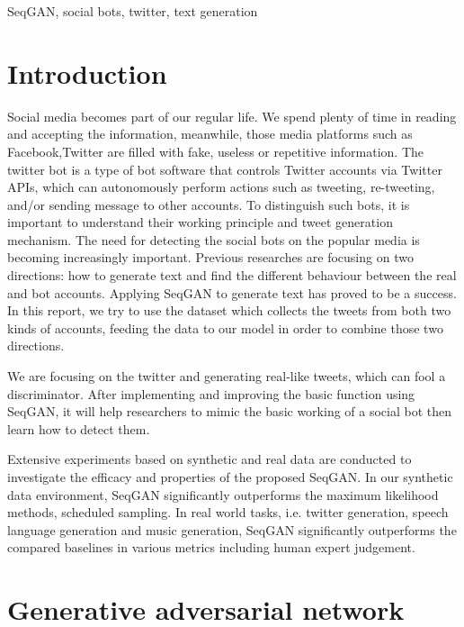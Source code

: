 \documentclass[conference]{IEEEtran}
\begin{document}
\begin{IEEEkeywords}
SeqGAN, social bots, twitter, text generation
\end{IEEEkeywords}

\section{Introduction}
    Social media becomes part of our regular life. We spend plenty of time in reading and accepting the information, meanwhile, those media platforms such as Facebook,Twitter are filled with fake, useless or repetitive information. The twitter bot is a type of bot software that controls Twitter accounts via Twitter APIs, which can autonomously perform actions such as tweeting, re-tweeting, and/or sending message to other accounts. To distinguish such bots, it is important to understand their working principle and tweet generation mechanism. The need for detecting the social bots on the popular media is becoming increasingly important. Previous researches are focusing on two directions: how to generate text and find the different behaviour between the real and bot accounts. Applying SeqGAN to generate text has proved to be a success. In this report, we try to use the dataset which collects the tweets from both two kinds of accounts, feeding the data to our model in order to combine those two directions.
    
    We are focusing on the twitter and generating real-like tweets, which can fool a discriminator. After implementing and improving the basic function using SeqGAN, it will help researchers to mimic the basic working of a social bot then learn how to detect them.
    
    Extensive experiments based on synthetic and real data
    are conducted to investigate the efficacy and properties of the proposed SeqGAN. In our synthetic data environment,
    SeqGAN significantly outperforms the maximum likelihood methods, scheduled sampling. In real world tasks, i.e. twitter generation, speech language generation and music generation, SeqGAN significantly outperforms the compared baselines in various metrics including human expert judgement.

\section{Generative adversarial network}
    
\end{document}
